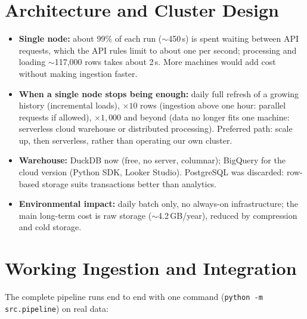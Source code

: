 \documentclass[11pt,a4paper]{article}
\begin{document}
\section{Architecture and Cluster Design}\label{sec:arch}
\begin{itemize}
  \item \textbf{Single node:} about 99\% of each run ($\sim$450\,s) is spent
        waiting between API requests, which the API rules limit to about one
        per second; processing and loading $\sim$117{,}000 rows takes about
        2\,s. More machines would add cost without making ingestion faster.
  \item \textbf{When a single node stops being enough:} daily full refresh of
        a growing history (incremental loads), $\times 10$ rows (ingestion
        above one hour: parallel requests if allowed), $\times 1{,}000$ and
        beyond (data no longer fits one machine: serverless cloud warehouse or
        distributed processing). Preferred path: scale up, then serverless,
        rather than operating our own cluster.
  \item \textbf{Warehouse:} DuckDB now (free, no server, columnar); BigQuery
        for the cloud version (Python SDK, Looker Studio). PostgreSQL was
        discarded: row-based storage suits transactions better than analytics.
  \item \textbf{Environmental impact:} daily batch only, no always-on
        infrastructure; the main long-term cost is raw storage
        ($\sim$4.2\,GB/year), reduced by compression and cold storage.
\end{itemize}

\section{Working Ingestion and Integration}\label{sec:ingestion}
The complete pipeline runs end to end with one command
(\texttt{python -m src.pipeline}) on real data:
\end{document}
